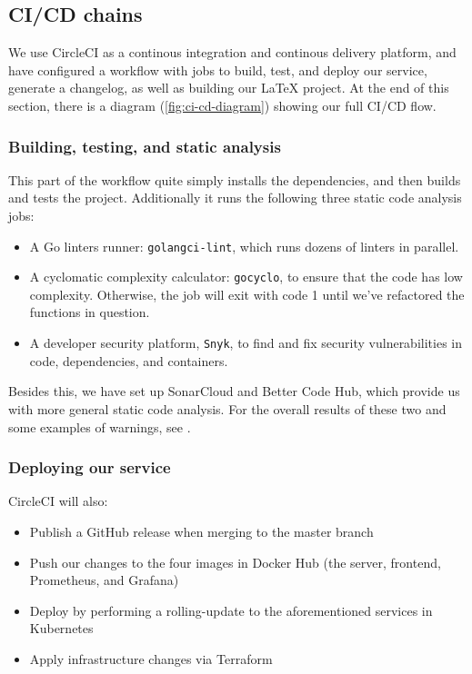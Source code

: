 \subsection{CI/CD chains}
\label{sec:ci-cd-chains}

We use CircleCI as a continous integration and continous delivery platform, and have configured a workflow \cite{workflow:circleci} with jobs to build, test, and deploy our service, generate a changelog, as well as building our LaTeX project. At the end of this section, there is a diagram (\autoref{fig:ci-cd-diagram}) showing our full CI/CD flow.

\subsubsection{Building, testing, and static analysis}

This part of the workflow quite simply installs the dependencies, and then builds and tests the project. Additionally it runs the following three static code analysis jobs:
\begin{itemize}
    \item A Go linters runner: \texttt{golangci-lint}, which runs dozens of linters in parallel.
    \item A cyclomatic complexity calculator: \texttt{gocyclo}, to ensure that the code has low complexity. Otherwise, the job will exit with code 1 until we've refactored the functions in question.
    \item A developer security platform, \texttt{Snyk}, to find and fix security vulnerabilities in code, dependencies, and containers.
\end{itemize}

Besides this, we have set up SonarCloud and Better Code Hub, which provide us with more general static code analysis. For the overall results of these two and some examples of warnings, see .

\subsubsection{Deploying our service}

CircleCI will also:
\begin{itemize}
    \item Publish a GitHub release when merging to the master branch
    \item Push our changes to the four images in Docker Hub (the server, frontend, Prometheus, and Grafana)
    \item Deploy by performing a rolling-update to the aforementioned services in Kubernetes
    \item Apply infrastructure changes via Terraform
\end{itemize}


